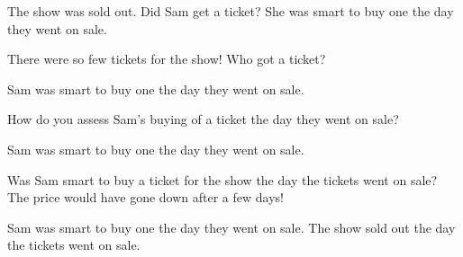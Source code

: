 \documentclass[11pt,fleqn]{article}
\newcommand{\6}{\mbox{$[\hspace*{-.6mm}[$}}
\newcommand{\9}{\mbox{$]\hspace*{-.6mm}]$}}
\begin{document}
\begin{exe}
\ex\label{ai}

\begin{xlist}
\ex
\begin{xlist}
 The show was sold out. Did Sam get a ticket?
 She was smart to buy one the day they went on sale.
\end{xlist}

\ex
\begin{xlist}
 There were so few tickets for the show! Who got a ticket?

 Sam was smart to buy one the day they went on sale. 

\end{xlist}

\ex
\begin{xlist}
 How do you assess Sam's buying of a ticket the day they went on sale?

 Sam was smart to buy one the day they went on sale.


\end{xlist}

\ex
\begin{xlist}
 Was Sam smart to buy a ticket for the show the day the tickets went on sale? The price would have gone down after a few days!

 Sam was smart to buy one the day they went on sale. The show sold out the day the tickets went on sale.

\end{xlist}

\end{xlist}
\end{exe}
\end{document}

